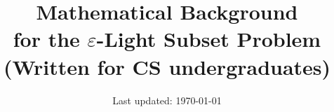 \documentclass[12pt]{article}
\title{\textbf{Mathematical Background}\\
\large for the $\varepsilon$-Light Subset Problem\\[4pt]
\normalsize (Written for CS undergraduates)}
\author{}
\date{Last updated: \today}
\theoremstyle{definition}
\theoremstyle{remark}
\newenvironment{resources}{%
  \vspace{4pt}\par\noindent
  \colorbox{blue!8}{\begin{minipage}{\dimexpr\linewidth-2\fboxsep}
  \small\textbf{Resources \& Links:}
}{%
  \end{minipage}}%
  \vspace{4pt}\par
}
\begin{document}
\maketitle

\begin{abstract}
\begin{CJK}{UTF8}{gbsn}
本文为 CS 本科生整理了阅读 $\varepsilon$-轻集问题所需的全部数学背景知识，包括图拉普拉斯矩阵、半正定矩阵、概率工具和矩阵集中不等式，每个概念都配有直观解释、具体例子和在线学习链接。
\end{CJK}

\medskip
This document collects all mathematical background needed to read the $\varepsilon$-light subset plan.
Every concept comes with an intuitive explanation, worked examples, and links to free online resources.
\end{abstract}

\tableofcontents
\newpage

\section{Graph Theory Basics}

\begin{resources}
\begin{itemize}\setlength\itemsep{0pt}
  \item Spielman's full textbook (free, April 2025 draft):
        \url{http://cs-www.cs.yale.edu/homes/spielman/sagt/sagt.pdf}
  \item Spielman's course page (lecture notes, videos):
        \url{https://www.cs.yale.edu/homes/spielman/561/}
  \item Wikipedia's Expander Graph page (good overview of graph families):
        \url{https://en.wikipedia.org/wiki/Expander_graph}
\end{itemize}
\end{resources}

\subsection{Graphs, Vertices, and Edges}

A \textbf{graph} $G = (V, E)$ has a vertex set $V = \{1,\ldots,n\}$ and an edge set
$E \subseteq {}$ of unordered pairs.  We write $n = |V|$ and $m = |E|$.
We consider only \textbf{simple undirected graphs}: no self-loops, no repeated edges.
\end{document}
